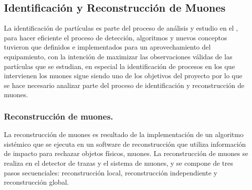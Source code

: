 \subsection{Identificación y Reconstrucción de Muones}

La identificación de partículas es parte del proceso de análisis y estudio en el \LHC, para hacer eficiente el proceso de detección, algoritmos y nuevos conceptos tuvieron que definidos e implementados para un aprovechamiento del equipamiento, con la intención de maximizar las observaciones válidas de las partículas que se estudian, en especial la identificación de procesos en los que intervienen los muones sigue siendo uno de los objetivos del proyecto por lo que se hace necesario analizar parte del proceso de identificación y reconstrucción de muones.

\subsubsection{Reconstrucción de muones.}
La reconstrucción de muones es resultado de la implementación de un algoritmo sistémico que se ejecuta en un software de reconstrucción que utiliza información de impacto para rechazar objetos físicos, muones. La reconstrucción de muones se realiza en el detector de trazas y el sistema de muones, y se compone de tres pasos secuenciales: reconstrucción local, reconstrucción independiente y reconstrucción global. 

